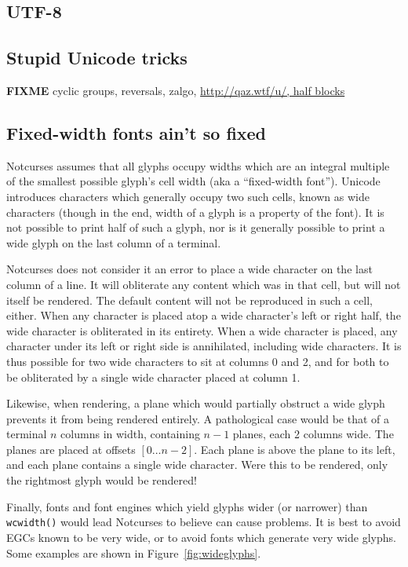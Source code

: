 \documentclass[letterpaper,10pt]{article}
\begin{document}
\subsection{UTF-8}
\subsection{Stupid Unicode tricks}
\textbf{FIXME} cyclic groups, reversals, zalgo, \url{http://qaz.wtf/u/, half blocks}

\subsection{Fixed-width fonts ain't so fixed}

Notcurses assumes that all glyphs occupy widths which are an integral multiple
of the smallest possible glyph's cell width (aka a ``fixed-width font'').
Unicode introduces characters which generally occupy two such cells, known as
wide characters (though in the end, width of a glyph is a property of the
font). It is not possible to print half of such a glyph, nor is it generally
possible to print a wide glyph on the last column of a terminal.

Notcurses does not consider it an error to place a wide character on the last
column of a line. It will obliterate any content which was in that cell, but
will not itself be rendered. The default content will not be reproduced in such
a cell, either. When any character is placed atop a wide character's left or
right half, the wide character is obliterated in its entirety. When a wide
character is placed, any character under its left or right side is annihilated,
including wide characters. It is thus possible for two wide characters to sit
at columns 0 and 2, and for both to be obliterated by a single wide character
placed at column 1.

Likewise, when rendering, a plane which would partially obstruct a wide glyph
prevents it from being rendered entirely. A pathological case would be that of
a terminal $n$ columns in width, containing $n-1$ planes, each 2 columns wide.
The planes are placed at offsets $[0\ldots n-2]$. Each plane is above the plane to
its left, and each plane contains a single wide character. Were this to be
rendered, only the rightmost glyph would be rendered!

Finally, fonts and font engines which yield glyphs wider (or narrower) than
\texttt{wcwidth()} would lead Notcurses to believe can cause problems. It is
best to avoid EGCs known to be very wide, or to avoid fonts which generate very
wide glyphs. Some examples are shown in Figure~\ref{fig:wideglyphs}.
\end{document}
